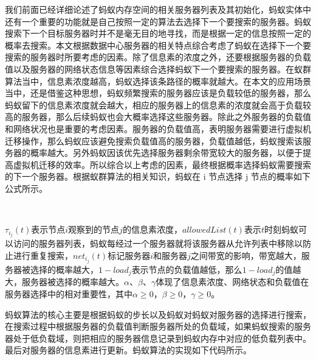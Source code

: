 我们前面已经详细论述了蚂蚁内存空间的相关服务器列表及其初始化，蚂蚁实体中还有一个重要的功能就是自己按照一定的算法去选择下一个要搜索的服务器。蚂蚁搜索下一个目标服务器时并不是毫无目的地寻找，而是根据一定的信息按照一定的概率去搜索。本文根据数据中心服务器的相关特点综合考虑了蚂蚁在选择下一个要搜索的服务器时所要考虑的因素。除了信息素的浓度之外，还要根据服务器的负载值以及服务器的网络状态信息等因素综合选择蚂蚁下一个要搜索的服务器。在蚁群算法当中，信息素浓度越高，蚂蚁选择该条路径的概率就越大。在本文的应用场景当中，还是借鉴这种思想，蚂蚁频繁搜索的服务器应该是负载较低的服务器，那么蚂蚁留下的信息素浓度就会越大，相应的服务器上的信息素的浓度就会高于负载较高的服务器，那么后续蚂蚁也会大概率选择这些服务器。除此之外服务器的负载值和网络状况也是重要的考虑因素。服务器的负载值高，表明服务器需要进行虚拟机迁移操作，那么蚂蚁应该避免搜索负载值高的服务器，负载值越低，蚂蚁搜索该服务器的概率越大。另外蚂蚁因该优先选择服务器剩余带宽较大的服务器，以便于提高虚拟机迁移的效率。所以综合以上考虑的因素，最终根据概率选择蚂蚁需要搜索的下一个服务器。根据蚁群算法的相关知识，蚂蚁在 i 节点选择 j 节点的概率如下公式所示。

\begin{figure}[htbp]
  \centering
  \includegraphics[width=0.9, height=0.25]{./Figure/IMG_Chap3_5.png}
\end{figure}

$ τ_i_j (t) $表示节点$ i $观察到的节点$ j $的信息素浓度，$allowedList(t) $表示$ t $时刻蚂蚁可以访问的服务器列表，蚂蚁每经过一个服务器就将该服务器从允许列表中移除以防止进行重复搜索，$net_i_j (t) $标记服务器$ i $和服务器$ j $之间带宽的影响，带宽越大，服务器被选择的概率越大，$1 - load_j $表示节点的负载值越低，那么$ 1 - load_j $的值越大，服务器被选择的概率越大。$ α、β、γ $体现了信息素浓度、网络状态和负载值在服务器选择中的相对重要性，其中$ α ≥0，β ≥0，γ ≥0 $。

蚂蚁算法的核心主要是根据蚂蚁的步长以及蚂蚁对蚂蚁对服务器的选择进行搜索，在搜索过程中根据服务器的负载值判断服务器所处的负载域，如果蚂蚁搜索的服务器处于低负载域，则把相应的服务器信息记录到蚂蚁内存中对应的低负载列表中。最后对服务器的信息素进行更新。蚂蚁算法的实现如下代码所示。

